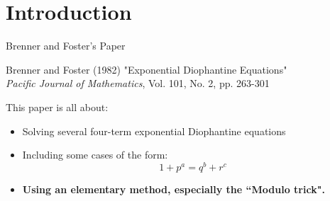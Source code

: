 \section{Introduction}

\begin{frame}{Brenner and Foster's Paper}
        \begin{block}{Brenner and Foster (1982)}
            "Exponential Diophantine Equations" \\
            \textit{Pacific Journal of Mathematics}, Vol. 101, No. 2, pp. 263-301
        \end{block}
        This paper is all about:
        \begin{itemize}
            \item Solving several four-term exponential Diophantine equations
            \item  Including some cases of the form:
            \begin{equation}
                \label{main}
                1+p^a = q^b + r^c
            \end{equation}
            \item \textbf{Using an elementary method, especially the ``Modulo trick".}
        \end{itemize}
\end{frame}

